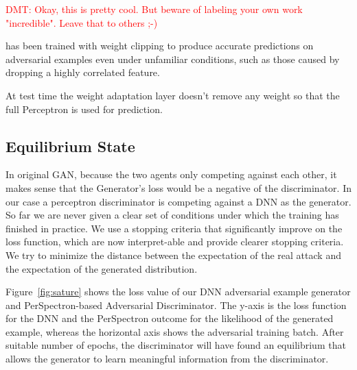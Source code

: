 \textcolor{red}{DMT: Okay, this is pretty cool.  But beware of labeling your own work "incredible".  Leave
that to others ;-)  }

\begin{note}
\scheme{} has been trained with weight clipping to produce accurate predictions on adversarial examples even under unfamiliar conditions, such as those caused by dropping a highly correlated feature.
\end{note}
 At test time the weight adaptation layer doesn't remove any weight so that the full Perceptron is used for prediction. 



\subsection{\scheme{} Equilibrium State }
In original GAN, because the two agents only competing against each other, it makes sense that the Generator's loss would be a negative of the discriminator. In our case a perceptron discriminator is competing against a DNN as the generator.  So far we are never given a clear set of conditions under which the training has finished in practice.
We use a stopping criteria that significantly improve on the loss function, which are now interpret-able and provide clearer stopping criteria. We try to minimize the distance between the expectation of the real attack and the expectation of the generated distribution.  


Figure~\ref{fig:sature} shows the loss value of our DNN adversarial example generator and PerSpectron-based Adversarial Discriminator. The y-axis is the loss function for the DNN and the PerSpectron outcome for the likelihood of the generated example, whereas the horizontal axis shows the adversarial training batch. After suitable number of epochs, the discriminator will have found an equilibrium that allows the generator to learn meaningful information from the discriminator. 


